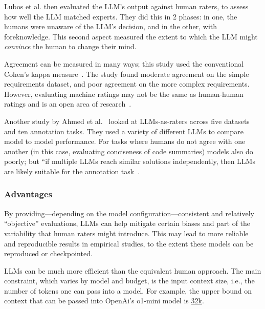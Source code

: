 \documentclass[11pt]{article}
\begin{document}
Lubos et al. then evaluated the LLM's output against human raters, to assess how well the LLM matched experts. They did this in 2 phases: in one, the humans were unaware of the LLM's decision, and in the other, with foreknowledge. This second aspect measured the extent to which the LLM might \emph{convince} the human to change their mind. 

Agreement can be measured in many ways; this study used the conventional Cohen's kappa measure~\cite{cohen60}. The study found moderate agreement on the simple requirements dataset, and poor agreement on the more complex requirements. However, evaluating machine ratings may not be the same as human-human ratings and is an open area of research~\cite{DBLP:journals/corr/abs-2410-03775}. 

Another study by Ahmed et al.~\cite{DBLP:journals/corr/abs-2408-05534} looked at LLMs-as-raters across five datasets and ten annotation tasks. They used a variety of different LLMs to compare model to model performance. For tasks where humans do not agree with one another (in this case, evaluating conciseness of code summaries) models also do poorly; but ``if multiple LLMs reach similar solutions independently, then LLMs are likely suitable for the annotation task~\cite[p.6]{DBLP:journals/corr/abs-2408-05534}.



\subsubsection{Advantages}

By providing---depending on the model configuration---consistent and relatively ``objective'' evaluations, LLMs can help mitigate certain biases and part of the variability that human raters might introduce. 
This may lead to more reliable and reproducible results in empirical studies, to the extent these models can be reproduced or checkpointed. %

LLMs can be much more efficient than the equivalent human approach. The main constraint, which varies by model and budget, is the input context size, i.e., the number of tokens one can pass into a model. For example, the upper bound on context that can be passed into OpenAi's \textsf{o1-mini} model is \href{https://help.openai.com/en/articles/9855712-openai-o1-models-faq-chatgpt-enterprise-and-edu}{32k}. 
\end{document}
